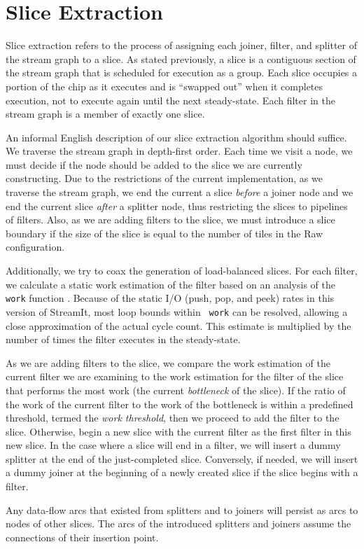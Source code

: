\section{Slice Extraction}
\label{sec:extract}
Slice extraction refers to the process of assigning each joiner,
filter, and splitter of the stream graph to a slice.  As stated
previously, a slice is a contiguous section of the stream graph that
is scheduled for execution as a group. Each slice occupies a portion
of the chip as it executes and is ``swapped out'' when it completes
execution, not to execute again until the next steady-state.  Each
filter in the stream graph is a member of exactly one slice.

An informal English description of our slice extraction algorithm
should suffice.  We traverse the stream graph in depth-first order.
Each time we visit a node, we must decide if the node should be added
to the slice we are currently constructing.  Due to the restrictions
of the current implementation, as we traverse the stream graph, we end
the current a slice {\it before} a joiner node and we end the current
slice {\it after} a splitter node, thus restricting the slices to
pipelines of filters.  Also, as we are adding filters to the slice, we
must introduce a slice boundary if the size of the slice is equal to
the number of tiles in the Raw configuration.

Additionally, we try to coax the generation of load-balanced slices.
For each filter, we calculate a static work estimation of the filter
based on an analysis of the {\tt work} function
\cite{streamit-asplos}.  Because of the static I/O (push, pop, and
peek) rates in this version of StreamIt, most loop bounds within {\tt
work} can be resolved, allowing a close approximation of the actual
cycle count.  This estimate is multiplied by the number of times the
filter executes in the steady-state.

As we are adding filters to the slice, we compare the work estimation
of the current filter we are examining to the work estimation for the
filter of the slice that performs the most work (the current {\it
bottleneck} of the slice).  If the ratio of the work of the current
filter to the work of the bottleneck is within a predefined
threshold, termed the {\it work threshold}, then we proceed to add the
filter to the slice.  Otherwise, begin a new slice with the current
filter as the first filter in this new slice. In the case where a
slice will end in a filter, we will insert a dummy splitter at the end
of the just-completed slice.  Conversely, if needed, we will insert a
dummy joiner at the beginning of a newly created slice if the slice
begins with a filter.

Any data-flow arcs that existed from splitters and to joiners will
persist as arcs to nodes of other slices.  The arcs of the introduced
splitters and joiners assume the connections of their insertion point.


